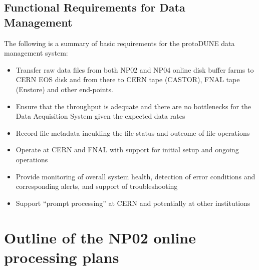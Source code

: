 \documentclass[12pt]{article}
\newcommand{\pd}{protoDUNE\xspace}
\begin{document}
\subsection{Functional Requirements for Data Management}
\label{sec:func_reqs}
The following is a summary of basic requirements for the \pd data management system:
\begin{itemize}

\item Transfer raw data files from both NP02 and NP04 online disk buffer farms
to CERN EOS disk and from there to CERN tape (CASTOR), FNAL tape (Enstore) and other end-points.

\item Ensure that the throughput is adequate and there are no bottlenecks for the Data Acquisition System
given the expected data rates

\item Record file metadata inculding the file status and outcome of file operations

\item Operate at CERN and FNAL with support for initial setup and ongoing operations

\item Provide monitoring of overall system health, detection of error conditions and corresponding alerts, and support of troubleshooting



\item Support ``prompt processing'' at CERN and potentially at other institutions

\end{itemize}



\section{Outline of the NP02 online processing plans}

\label{sec:np02_online_processing}
\end{document}
